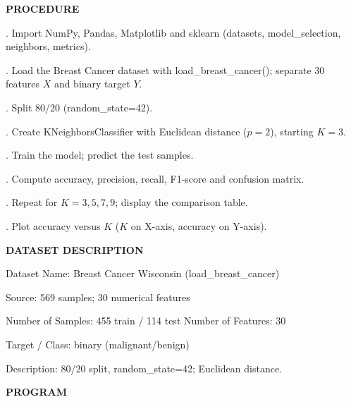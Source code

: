 \documentclass[11pt,twoside]{article}
\newcommand{\expheading}[1]{{\fontsize{14}{17}\selectfont\textbf{#1}\par}}
\newcommand{\toevenpage}{\clearpage\ifodd\value{page}\null\thispagestyle{empty}\newpage\fi}
\begin{document}
{\expheading{PROCEDURE}
\vspace{4pt}
. Import NumPy, Pandas, Matplotlib and sklearn (datasets, model\_selection, neighbors, metrics).\par
{}. Load the Breast Cancer dataset with load\_breast\_cancer(); separate 30 features $X$ and binary target $Y$.\par
{}. Split 80/20 (random\_state=42).\par
{}. Create KNeighborsClassifier with Euclidean distance ($p=2$), starting $K=3$.\par
{}. Train the model; predict the test samples.\par
{}. Compute accuracy, precision, recall, F1-score and confusion matrix.\par
{}. Repeat for $K=3,5,7,9$; display the comparison table.\par
{}. Plot accuracy versus $K$ ($K$ on X-axis, accuracy on Y-axis). \par
\vspace{4pt}

\expheading{DATASET DESCRIPTION}
\vspace{4pt}
\noindent Dataset Name: Breast Cancer Wisconsin (load\_breast\_cancer)\par
\noindent Source: 569 samples; 30 numerical features\par
\noindent Number of Samples: 455 train / 114 test \hspace{0.3cm} Number of Features: 30\par
\noindent Target / Class: binary (malignant/benign)\par
\noindent Description: 80/20 split, random\_state=42; Euclidean distance. \par
\vspace{4pt}
} %
\toevenpage
\expheading{PROGRAM}
\vspace{6pt}
\end{document}
